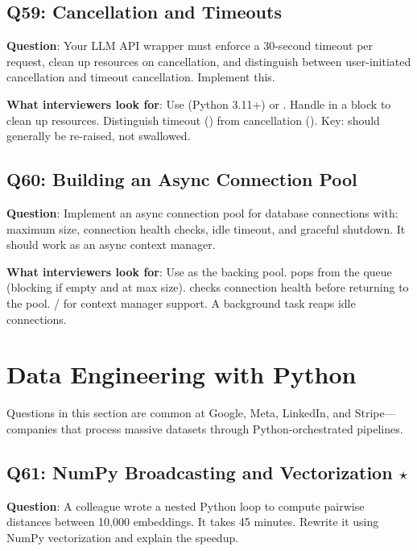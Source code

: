 \subsection{Q59: Cancellation and Timeouts}

\textbf{Question}: Your LLM API wrapper must enforce a 30-second timeout per request, clean up resources on cancellation, and distinguish between user-initiated cancellation and timeout cancellation. Implement this.

\textbf{What interviewers look for}: Use  (Python 3.11+) or . Handle  in a  block to clean up resources. Distinguish timeout () from cancellation (). Key:  should generally be re-raised, not swallowed.

\subsection{Q60: Building an Async Connection Pool}

\textbf{Question}: Implement an async connection pool for database connections with: maximum size, connection health checks, idle timeout, and graceful shutdown. It should work as an async context manager.

\textbf{What interviewers look for}: Use  as the backing pool.  pops from the queue (blocking if empty and at max size).  checks connection health before returning to the pool. / for context manager support. A background task reaps idle connections.


\section{Data Engineering with Python}

Questions in this section are common at Google, Meta, LinkedIn, and Stripe---companies that process massive datasets through Python-orchestrated pipelines.

\subsection{Q61: NumPy Broadcasting and Vectorization $\star$}

\textbf{Question}: A colleague wrote a nested Python loop to compute pairwise distances between 10,000 embeddings. It takes 45 minutes. Rewrite it using NumPy vectorization and explain the speedup.

